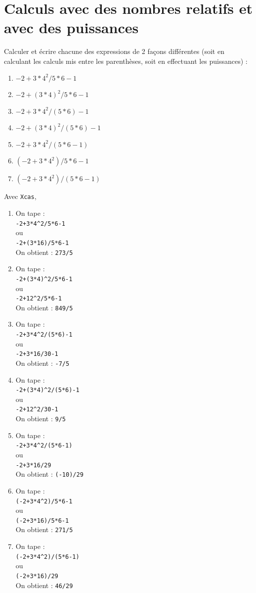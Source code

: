 \documentclass[a4paper,11pt]{book}
\begin{document}
\section{Calculs avec des nombres relatifs et avec des puissances}
Calculer et \'ecrire chacune des expressions de 2 fa\c{c}ons diff\'erentes 
(soit en calculant les calculs mis entre les parenth\`eses, soit en effectuant 
les puissances) :
\begin{enumerate}
\item $-2+3*4^2/5*6-1$ 
\item $-2+(3*4)^2/5*6-1$
\item $-2+3*4^2/(5*6)-1$
\item $-2+(3*4)^2/(5*6)-1$
\item $-2+3*4^2/(5*6-1)$
\item $(-2+3*4^2)/5*6-1$ 
\item $(-2+3*4^2)/(5*6-1)$
\end{enumerate}
Avec {\tt Xcas}, 
\begin{enumerate}
\item On tape :\\
{\tt -2+3*4\verb|^|2/5*6-1}\\ 
ou \\
{\tt -2+(3*16)/5*6-1}\\ 
On obtient :  {\tt 273/5}
\item On tape :\\
{\tt -2+(3*4)\verb|^|2/5*6-1}\\
ou \\
{\tt -2+12\verb|^|2/5*6-1}\\ 
On obtient :  {\tt 849/5}
\item On tape :\\
{\tt -2+3*4\verb|^|2/(5*6)-1}\\
ou \\
{\tt -2+3*16/30-1}\\
On obtient :  {\tt -7/5}
\item On tape :\\
{\tt -2+(3*4)\verb|^|2/(5*6)-1}\\
ou \\
{\tt -2+12\verb|^|2/30-1}\\
On obtient :  {\tt 9/5}
\item On tape :\\
{\tt -2+3*4\verb|^|2/(5*6-1)}\\
ou \\
{\tt -2+3*16/29}\\
On obtient :  {\tt (-10)/29}
\item On tape :\\
{\tt (-2+3*4\verb|^|2)/5*6-1}\\
ou \\
{\tt (-2+3*16)/5*6-1}\\ 
On obtient :  {\tt 271/5}
\item On tape :\\
{\tt (-2+3*4\verb|^|2)/(5*6-1)}\\
ou \\
{\tt (-2+3*16)/29}\\ 
On obtient :  {\tt 46/29}
\end{enumerate}
\end{document}
